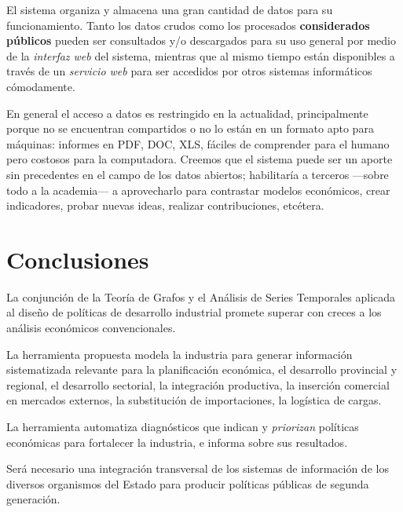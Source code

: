 \documentclass[a4paper]{report}
\begin{document}
El sistema organiza y almacena una gran cantidad de datos para su funcionamiento. Tanto los datos crudos como los procesados \textbf{considerados públicos} pueden ser consultados y/o descargados para su uso general por medio de la \textit{interfaz web} del sistema, mientras que al mismo tiempo están disponibles a través de un \textit{servicio web} para ser accedidos por otros sistemas informáticos cómodamente.

En general el acceso a datos es restringido en la actualidad, principalmente porque no se encuentran compartidos o no lo están en un formato apto para máquinas: informes en PDF, DOC, XLS, fáciles de comprender para el humano pero costosos para la computadora. Creemos que el sistema puede ser un aporte sin precedentes en el campo de los datos abiertos; habilitaría a terceros —sobre todo a la academia— a aprovecharlo para contrastar modelos económicos, crear indicadores, probar nuevas ideas, realizar contribuciones, etcétera.

\section*{Conclusiones}


La conjunción de la Teoría de Grafos y el Análisis de Series Temporales aplicada al diseño de políticas de desarrollo industrial promete superar con creces a los análisis económicos convencionales.

La herramienta propuesta modela la industria para generar información sistematizada relevante para la planificación económica, el desarrollo provincial y regional, el desarrollo sectorial, la integración productiva, la inserción comercial en mercados externos, la substitución de importaciones, la logística de cargas.

La herramienta automatiza diagnósticos que indican y \textit{priorizan} políticas económicas para fortalecer la industria, e informa sobre sus resultados.

Será necesario una integración transversal de los sistemas de información de los diversos organismos del Estado para producir políticas públicas de segunda generación.
\end{document}

